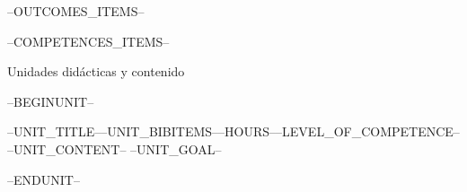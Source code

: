
\begin{syllabus}


\begin{outcomes}
--OUTCOMES_ITEMS--
\end{outcomes}

\begin{competences}
--COMPETENCES_ITEMS--
\end{competences}




\begin{syllabus-section}{Unidades didácticas y contenido}%
\end{syllabus-section}%
 
--BEGINUNIT--
\begin{unit}{--UNIT_TITLE--}{}{--UNIT_BIBITEMS--}{--HOURS--}{--LEVEL_OF_COMPETENCE--}
--UNIT_CONTENT--
--UNIT_GOAL--
\end{unit}

--ENDUNIT--

\begin{coursebibliography}
\end{coursebibliography}

\end{syllabus}

%
